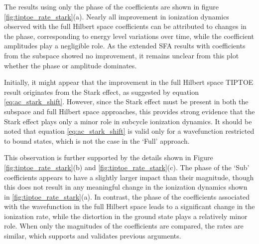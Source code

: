 \medskip
The results using only the phase of the coefficients are shown in figure \ref{fig:tiptoe_rate_stark}(a).
Nearly all improvement in ionization dynamics observed with the full Hilbert space coefficients can be attributed to changes in the phase, corresponding to energy level variations over time, while the coefficient amplitudes play a negligible role.
As the extended SFA results with coefficients from the subspace showed no improvement, it remains unclear from this plot whether the phase or amplitude dominates.

\medskip
Initially, it might appear that the improvement in the full Hilbert space TIPTOE result originates from the Stark effect, as suggested by equation \eqref{eq:ac_stark_shift}.
However, since the Stark effect must be present in both the subspace and full Hilbert space approaches, this provides strong evidence that the Stark effect plays only a minor role in subcycle ionization dynamics.
It should be noted that equation \eqref{eq:ac_stark_shift} is valid only for a wavefunction restricted to bound states, which is not the case in the `Full' approach.


\medskip
This observation is further supported by the details shown in Figure \ref{fig:tiptoe_rate_stark}(b) and \ref{fig:tiptoe_rate_stark}(c).
The phase of the `Sub' coefficients appears to have a slightly larger impact than their magnitude, though this does not result in any meaningful change in the ionization dynamics shown in \ref{fig:tiptoe_rate_stark}(a).
In contrast, the phase of the coefficients associated with the wavefunction in the full Hilbert space leads to a significant change in the ionization rate, while the distortion in the ground state plays a relatively minor role.
When only the magnitudes of the coefficients are compared, the rates are similar, which supports and validates previous arguments.

